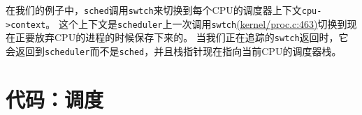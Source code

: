 在我们的例子中，\texttt{sched}调用\texttt{swtch}来切换到每个CPU的调度器上下文\texttt{cpu->context}。
这个上下文是\texttt{scheduler}上一次调用\texttt{swtch}\href{https://github.com/mit-pdos/xv6-riscv/blob/risc/kernel/proc.c#L463}{(kernel/proc.c:463)}切换到现在正要放弃CPU的进程的时候保存下来的。
当我们正在追踪的\texttt{swtch}返回时，它会返回到\texttt{scheduler}而不是\texttt{sched}，并且栈指针现在指向当前CPU的调度器栈。

\section{代码：调度}
